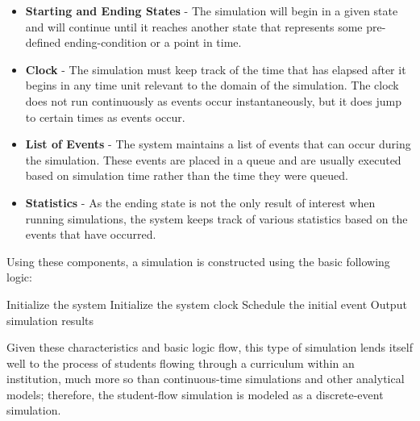 \documentclass[botnum, fleqn]{unmeethesis}
\begin{document}
  \begin{itemize}
  \item \textbf{Starting and Ending States} - The simulation will begin in a given state and will continue until it reaches another state that represents some pre-defined ending-condition or a point in time.
  \item \textbf{Clock} - The simulation must keep track of the time that has elapsed after it begins in any time unit relevant to the domain of the simulation. The clock does not run continuously as events occur instantaneously, but it does jump to certain times as events occur.
  \item \textbf{List of Events} - The system maintains a list of events that can occur during the simulation. These events are placed in a queue and are usually executed based on simulation time rather than the time they were queued.
  \item \textbf{Statistics} - As the ending state is not the only result of interest when running simulations, the system keeps track of various statistics based on the events that have occurred.
  \end{itemize}

  Using these components, a simulation is constructed using the basic following logic:

  \begin{algorithmic}[1]
  \STATE Initialize the system
  \STATE Initialize the system clock
  \STATE Schedule the initial event
  \ENDWHILE
  \STATE Output simulation results
  \end{algorithmic}

  Given these characteristics and basic logic flow, this type of simulation lends itself well to the process of students flowing through a curriculum within an institution, much more so than continuous-time simulations and other analytical models; therefore, the student-flow simulation is modeled as a discrete-event simulation.
\end{document}
